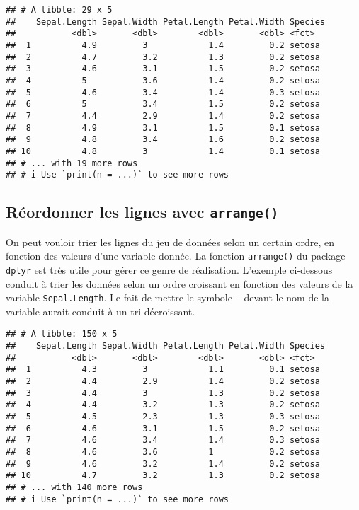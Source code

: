 \documentclass[
  french,
]{book}
\newenvironment{Shaded}{\begin{snugshade}}{\end{snugshade}}
\newcommand{\KeywordTok}[1]{\textcolor[rgb]{0.13,0.29,0.53}{\textbf{#1}}}
\newcommand{\NormalTok}[1]{#1}
\newcommand{\OperatorTok}[1]{\textcolor[rgb]{0.81,0.36,0.00}{\textbf{#1}}}
\newcommand{\StringTok}[1]{\textcolor[rgb]{0.31,0.60,0.02}{#1}}
\begin{document}
\begin{verbatim}
## # A tibble: 29 x 5
##    Sepal.Length Sepal.Width Petal.Length Petal.Width Species
##           <dbl>       <dbl>        <dbl>       <dbl> <fct>  
##  1          4.9         3            1.4         0.2 setosa 
##  2          4.7         3.2          1.3         0.2 setosa 
##  3          4.6         3.1          1.5         0.2 setosa 
##  4          5           3.6          1.4         0.2 setosa 
##  5          4.6         3.4          1.4         0.3 setosa 
##  6          5           3.4          1.5         0.2 setosa 
##  7          4.4         2.9          1.4         0.2 setosa 
##  8          4.9         3.1          1.5         0.1 setosa 
##  9          4.8         3.4          1.6         0.2 setosa 
## 10          4.8         3            1.4         0.1 setosa 
## # ... with 19 more rows
## # i Use `print(n = ...)` to see more rows
\end{verbatim}

\hypertarget{ruxe9ordonner-les-lignes-avec-arrange}{%
\subsection{\texorpdfstring{Réordonner les lignes avec \texttt{arrange()}}{Réordonner les lignes avec arrange()}}\label{ruxe9ordonner-les-lignes-avec-arrange}}

On peut vouloir trier les lignes du jeu de données selon un certain ordre, en fonction des valeurs d'une variable donnée. La fonction \texttt{arrange()} du package \texttt{dplyr} est très utile pour gérer ce genre de réalisation. L'exemple ci-dessous conduit à trier les données selon un ordre croissant en fonction des valeurs de la variable \texttt{Sepal.Length}. Le fait de mettre le symbole \texttt{-} devant le nom de la variable aurait conduit à un tri décroissant.

\begin{Shaded}
\end{Shaded}

\begin{verbatim}
## # A tibble: 150 x 5
##    Sepal.Length Sepal.Width Petal.Length Petal.Width Species
##           <dbl>       <dbl>        <dbl>       <dbl> <fct>  
##  1          4.3         3            1.1         0.1 setosa 
##  2          4.4         2.9          1.4         0.2 setosa 
##  3          4.4         3            1.3         0.2 setosa 
##  4          4.4         3.2          1.3         0.2 setosa 
##  5          4.5         2.3          1.3         0.3 setosa 
##  6          4.6         3.1          1.5         0.2 setosa 
##  7          4.6         3.4          1.4         0.3 setosa 
##  8          4.6         3.6          1           0.2 setosa 
##  9          4.6         3.2          1.4         0.2 setosa 
## 10          4.7         3.2          1.3         0.2 setosa 
## # ... with 140 more rows
## # i Use `print(n = ...)` to see more rows
\end{verbatim}
\end{document}
